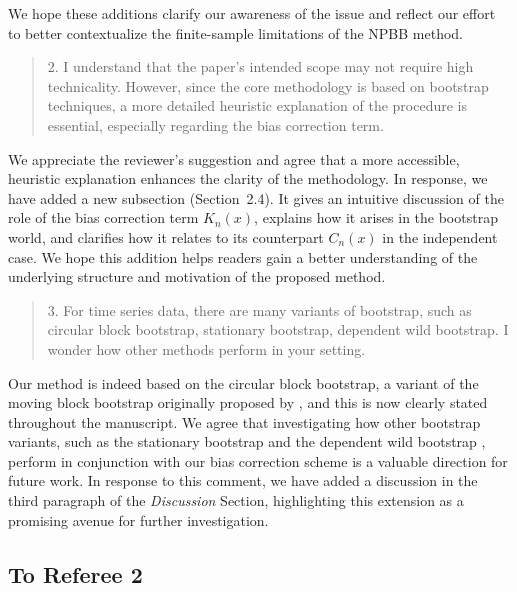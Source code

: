 \documentclass[12pt]{article}
\newenvironment{comment}%
{\begin{quotation}\noindent\small\it\color{darkblue}\ignorespaces%
}{\end{quotation}}
\begin{document}
We hope these additions clarify our awareness of the issue and reflect 
our effort to better contextualize the finite-sample limitations of the 
NPBB method.



\begin{comment}
2. I understand that the paper’s intended scope may not require high 
technicality. However,
since the core methodology is based on bootstrap techniques, a more detailed 
heuristic
explanation of the procedure is essential, especially regarding the bias 
correction term.
\end{comment}


We appreciate the reviewer’s suggestion and agree that a more accessible, 
heuristic explanation enhances the clarity of the methodology. In response, 
we have added a new subsection (Section~2.4). It gives an intuitive
discussion of the role of the bias correction term $ K_n(x)$, explains
how it arises in the bootstrap world, and clarifies how it relates to
its counterpart $C_n(x)$ in the independent case. We hope this
addition helps readers gain a better understanding of the underlying
structure and motivation of the proposed method.


\begin{comment}
3. For time series data, there are many variants of bootstrap, such as circular 
block bootstrap,
stationary bootstrap, dependent wild bootstrap. I wonder how other methods 
perform in
your setting.
\end{comment} 

Our method is indeed based on the circular block bootstrap, a variant
of the moving block bootstrap originally proposed by
\citet{romano1992circular}, and this is now clearly stated throughout
the manuscript. We agree that investigating how other bootstrap
variants, such as the stationary bootstrap
\citep{politis1994stationary} and the dependent wild
bootstrap \citep{shao2010dependent}, perform in conjunction with our
bias correction scheme is a valuable direction for future work. In
response to this comment, we have added a discussion in the third
paragraph of the \emph{Discussion} Section, highlighting this
extension as a promising avenue for further investigation.


\subsection*{To Referee 2}
\end{document}
